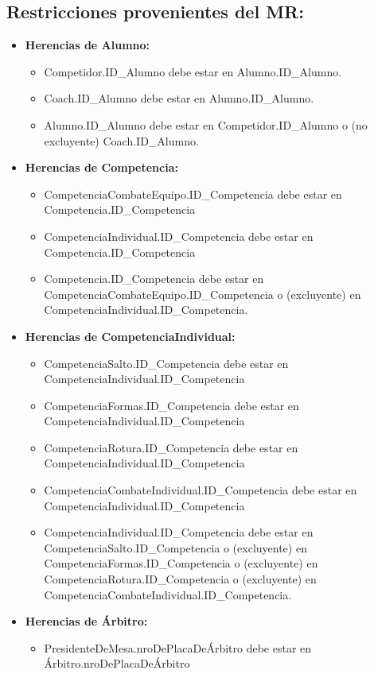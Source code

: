 \subsection{Restricciones provenientes del MR:}
\begin{itemize}
\item \textbf{Herencias de Alumno:}
\begin{itemize}
\item Competidor.ID\_Alumno debe estar en Alumno.ID\_Alumno.
\item Coach.ID\_Alumno debe estar en Alumno.ID\_Alumno.
\item Alumno.ID\_Alumno debe estar en Competidor.ID\_Alumno o (no excluyente) Coach.ID\_Alumno.
\end{itemize}
\item \textbf{Herencias de Competencia:}
\begin{itemize}
\item CompetenciaCombateEquipo.ID\_Competencia debe estar en Competencia.ID\_Competencia
\item CompetenciaIndividual.ID\_Competencia debe estar en Competencia.ID\_Competencia
\item Competencia.ID\_Competencia debe estar en CompetenciaCombateEquipo.ID\_Competencia o (excluyente) en CompetenciaIndividual.ID\_Competencia.
\end{itemize}
\item \textbf{Herencias de CompetenciaIndividual:}
\begin{itemize}
\item CompetenciaSalto.ID\_Competencia debe estar en CompetenciaIndividual.ID\_Competencia
\item CompetenciaFormas.ID\_Competencia debe estar en CompetenciaIndividual.ID\_Competencia
\item CompetenciaRotura.ID\_Competencia debe estar en CompetenciaIndividual.ID\_Competencia
\item CompetenciaCombateIndividual.ID\_Competencia debe estar en CompetenciaIndividual.ID\_Competencia
\item CompetenciaIndividual.ID\_Competencia debe estar en CompetenciaSalto.ID\_Competencia o (excluyente) en CompetenciaFormas.ID\_Competencia o (excluyente) en CompetenciaRotura.ID\_Competencia o (excluyente) en CompetenciaCombateIndividual.ID\_Competencia.
\end{itemize}
\item \textbf{Herencias de Árbitro:}
\begin{itemize}
\item PresidenteDeMesa.nroDePlacaDeÁrbitro debe estar en Árbitro.nroDePlacaDeÁrbitro

\end{itemize}
\end{itemize}
